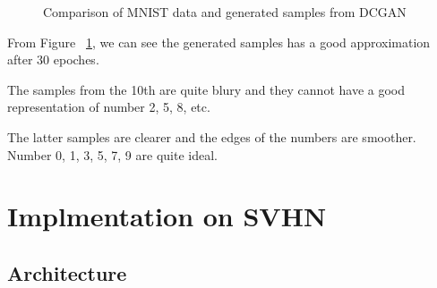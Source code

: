 \documentclass{article}
\begin{document}
\begin{figure}[!htb]
  \centering
  \caption{Comparison of MNIST data and generated samples from DCGAN}
  \label{fig:DCGAN_MNIST}
\end{figure}

From Figure ~\ref{fig:DCGAN_MNIST}, 
we can see the generated samples has a good approximation after 30 epoches.

The samples from the 10th are quite blury and they cannot have a good representation of number 2, 5, 8, etc.

The latter samples are clearer and the edges of the numbers are smoother. Number 0, 1, 3, 5, 7, 9 are quite ideal.

\section{Implmentation on SVHN}

\subsection{Architecture}
\end{document}
